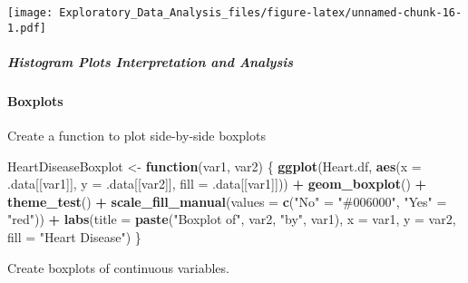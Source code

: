 \documentclass[
]{article}
\newenvironment{Shaded}{\begin{snugshade}}{\end{snugshade}}
\newcommand{\AttributeTok}[1]{\textcolor[rgb]{0.13,0.29,0.53}{#1}}
\newcommand{\ControlFlowTok}[1]{\textcolor[rgb]{0.13,0.29,0.53}{\textbf{#1}}}
\newcommand{\FunctionTok}[1]{\textcolor[rgb]{0.13,0.29,0.53}{\textbf{#1}}}
\newcommand{\NormalTok}[1]{#1}
\newcommand{\OtherTok}[1]{\textcolor[rgb]{0.56,0.35,0.01}{#1}}
\newcommand{\SpecialCharTok}[1]{\textcolor[rgb]{0.81,0.36,0.00}{\textbf{#1}}}
\newcommand{\StringTok}[1]{\textcolor[rgb]{0.31,0.60,0.02}{#1}}
\begin{document}
\texttt{[image: Exploratory\_Data\_Analysis\_files/figure-latex/unnamed-chunk-16-1.pdf]}

\subparagraph{\texorpdfstring{\textbf{Histogram Plots Interpretation and
Analysis}}{Histogram Plots Interpretation and Analysis}}\label{histogram-plots-interpretation-and-analysis}

\paragraph{\texorpdfstring{\textbf{Boxplots}}{Boxplots}}\label{boxplots}

Create a function to plot side-by-side boxplots

\begin{Shaded}
\begin{Highlighting}[]
\NormalTok{HeartDiseaseBoxplot }\OtherTok{\textless{}{-}} \ControlFlowTok{function}\NormalTok{(var1, var2) \{}
  \FunctionTok{ggplot}\NormalTok{(Heart.df, }\FunctionTok{aes}\NormalTok{(}\AttributeTok{x =}\NormalTok{ .data[[var1]],}
                       \AttributeTok{y =}\NormalTok{ .data[[var2]],}
                       \AttributeTok{fill =}\NormalTok{ .data[[var1]])) }\SpecialCharTok{+}
    \FunctionTok{geom\_boxplot}\NormalTok{() }\SpecialCharTok{+} \FunctionTok{theme\_test}\NormalTok{() }\SpecialCharTok{+}
    \FunctionTok{scale\_fill\_manual}\NormalTok{(}\AttributeTok{values =} \FunctionTok{c}\NormalTok{(}\StringTok{"No"} \OtherTok{=} \StringTok{"\#006000"}\NormalTok{, }\StringTok{"Yes"} \OtherTok{=} \StringTok{"red"}\NormalTok{)) }\SpecialCharTok{+}
    \FunctionTok{labs}\NormalTok{(}\AttributeTok{title =} \FunctionTok{paste}\NormalTok{(}\StringTok{"Boxplot of"}\NormalTok{, var2, }\StringTok{"by"}\NormalTok{, var1),}
         \AttributeTok{x =}\NormalTok{ var1, }\AttributeTok{y =}\NormalTok{ var2, }\AttributeTok{fill =} \StringTok{"Heart Disease"}\NormalTok{)}
\NormalTok{\}}
\end{Highlighting}
\end{Shaded}

Create boxplots of continuous variables.
\end{document}
